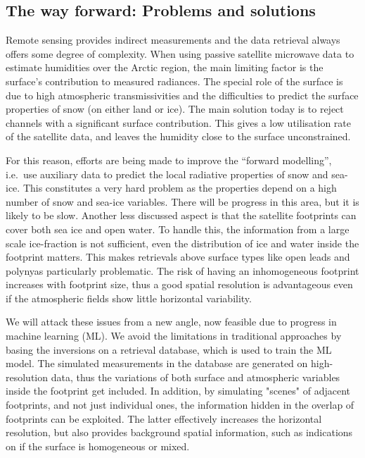 \documentclass[12pt,oneside,a4paper]{article}
\begin{document}
\subsection{The way forward: Problems and solutions }

Remote sensing provides indirect measurements and the data retrieval always offers some degree of complexity. When using passive satellite microwave data to estimate humidities over the Arctic region, the main limiting factor is the surface's contribution to measured radiances. The special role of the surface is due to high atmospheric transmissivities and the difficulties to predict the surface properties of snow (on either land or ice).
The main solution today is to reject channels with a significant surface
contribution. This gives a low utilisation rate of the satellite data, and
leaves the humidity close to the surface unconstrained.

For this reason, efforts are being made to improve the 	``forward modelling'',
i.e.\ use auxiliary data to predict the local radiative properties of snow and
sea-ice. This constitutes a very hard problem
as the properties depend on a high number of snow and sea-ice
variables. There will be progress in this area, but it is likely to be slow.
Another less discussed aspect is that the satellite footprints can cover both sea ice and open water. To handle this, the information from a large scale ice-fraction is not sufficient, even the distribution of ice and water inside the footprint matters. This makes retrievals above surface types like open leads and polynyas particularly problematic. The risk of having an inhomogeneous footprint increases with
footprint size, thus a good spatial resolution is advantageous even if the atmospheric fields show little horizontal variability.

We will attack these issues from a new angle, now feasible due to progress in
machine learning (ML). We avoid the limitations in traditional approaches by
basing the inversions on a retrieval database, which is used to train the ML
model. The simulated measurements in the database are generated on
high-resolution data, thus the variations of both surface and atmospheric variables
inside the footprint get included. In addition, by simulating "scenes" of
adjacent footprints, and not just individual ones, the information hidden in
the overlap of footprints can be exploited. The latter effectively increases the
horizontal resolution, but also provides background spatial information, such
as indications on if the surface is homogeneous or mixed.
\end{document}
